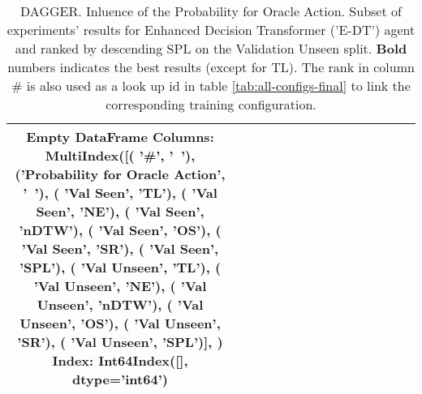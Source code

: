 \begin{table}
\centering
\caption{\label{tab:e_dt_dagger_prob}DAGGER. Inluence of the Probability for Oracle Action. Subset of experiments' results for Enhanced Decision Transformer ('E-DT') agent and ranked by descending SPL on the Validation Unseen split. \textbf{Bold} numbers indicates the best results (except for TL). The rank in column \# is also used as a look up id in table \ref{tab:all-configs-final} to link the corresponding training configuration.}
\begin{tabular}{@{\hskip3pt}c@{\hskip3pt}c@{\hskip3pt}c@{\hskip3pt}c@{\hskip3pt}c@{\hskip3pt}c@{\hskip3pt}c@{\hskip3pt}c@{\hskip3pt}c@{\hskip3pt}c@{\hskip3pt}c@{\hskip3pt}c@{\hskip3pt}c@{\hskip3pt}c@{\hskip3pt}c}
\toprule
Empty DataFrame
Columns: MultiIndex([(                           '\textbf{\#}',    '\textbf{~}'),
            ('\textbf{Probability for Oracle Action}',    '\textbf{~}'),
            (                     '\textbf{Val Seen}',   '\textbf{TL}'),
            (                     '\textbf{Val Seen}',   '\textbf{NE}'),
            (                     '\textbf{Val Seen}', '\textbf{nDTW}'),
            (                     '\textbf{Val Seen}',   '\textbf{OS}'),
            (                     '\textbf{Val Seen}',   '\textbf{SR}'),
            (                     '\textbf{Val Seen}',  '\textbf{SPL}'),
            (                   '\textbf{Val Unseen}',   '\textbf{TL}'),
            (                   '\textbf{Val Unseen}',   '\textbf{NE}'),
            (                   '\textbf{Val Unseen}', '\textbf{nDTW}'),
            (                   '\textbf{Val Unseen}',   '\textbf{OS}'),
            (                   '\textbf{Val Unseen}',   '\textbf{SR}'),
            (                   '\textbf{Val Unseen}',  '\textbf{SPL}')],
           )
Index: Int64Index([], dtype='int64') \\
\bottomrule
\end{tabular}
\end{table}
